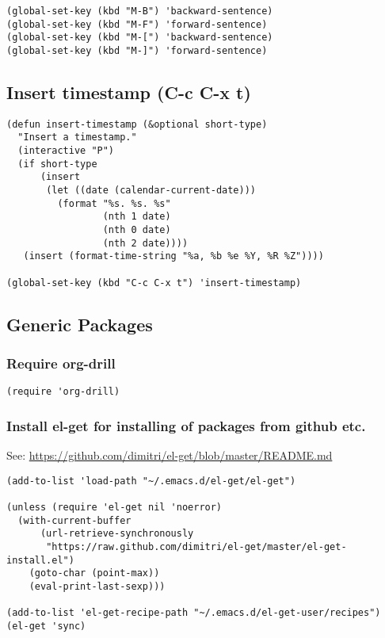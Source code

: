 \documentclass{article}
\begin{document}
\begin{verbatim}
(global-set-key (kbd "M-B") 'backward-sentence)
(global-set-key (kbd "M-F") 'forward-sentence)
(global-set-key (kbd "M-[") 'backward-sentence)
(global-set-key (kbd "M-]") 'forward-sentence)
\end{verbatim}
\subsection{Insert timestamp (C-c C-x t)}
\label{sec-1-10}

\begin{verbatim}
(defun insert-timestamp (&optional short-type)
  "Insert a timestamp."
  (interactive "P")
  (if short-type
      (insert
       (let ((date (calendar-current-date)))
         (format "%s. %s. %s"
                 (nth 1 date)
                 (nth 0 date)
                 (nth 2 date))))
   (insert (format-time-string "%a, %b %e %Y, %R %Z"))))

(global-set-key (kbd "C-c C-x t") 'insert-timestamp)
\end{verbatim}
\subsection{Generic Packages}
\label{sec-1-11}
\subsubsection{Require org-drill}
\label{sec-1-11-1}
\begin{verbatim}
(require 'org-drill)
\end{verbatim}

\subsubsection{Install el-get for installing of packages from github etc.}
\label{sec-1-11-2}

See: \url{https://github.com/dimitri/el-get/blob/master/README.md}

\begin{verbatim}
(add-to-list 'load-path "~/.emacs.d/el-get/el-get")

(unless (require 'el-get nil 'noerror)
  (with-current-buffer
      (url-retrieve-synchronously
       "https://raw.github.com/dimitri/el-get/master/el-get-install.el")
    (goto-char (point-max))
    (eval-print-last-sexp)))

(add-to-list 'el-get-recipe-path "~/.emacs.d/el-get-user/recipes")
(el-get 'sync)
\end{verbatim}
\end{document}
